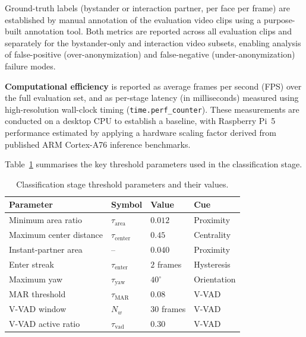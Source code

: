 Ground-truth labels (bystander or interaction partner, per face per frame) are
established by manual annotation of the evaluation video clips using a purpose-built
annotation tool. Both metrics are reported across all evaluation clips and separately for
the bystander-only and interaction video subsets, enabling analysis of false-positive
(over-anonymization) and false-negative (under-anonymization) failure modes.

\textbf{Computational efficiency} is reported as average frames per second (FPS) over
the full evaluation set, and as per-stage latency (in milliseconds) measured using
high-resolution wall-clock timing (\texttt{time.perf\_counter}). These measurements are
conducted on a desktop CPU to establish a baseline, with Raspberry Pi~5 performance
estimated by applying a hardware scaling factor derived from published ARM
Cortex-A76 inference benchmarks.

Table~\ref{tab:params} summarises the key threshold parameters used in the classification
stage.

\begin{table}[htbp]
\begin{singlespace}
\centering
\caption{Classification stage threshold parameters and their values.}
\label{tab:params}
\renewcommand{\arraystretch}{1.3}
\begin{tabular}{@{}llll@{}}
\toprule
\textbf{Parameter} & \textbf{Symbol} & \textbf{Value} & \textbf{Cue} \\
\midrule
Minimum area ratio       & $\tau_{\mathrm{area}}$    & $0.012$   & Proximity \\
Maximum center distance  & $\tau_{\mathrm{center}}$  & $0.45$    & Centrality \\
Instant-partner area     & --                         & $0.040$   & Proximity \\
Enter streak             & $\tau_{\mathrm{enter}}$   & $2$ frames & Hysteresis \\
Maximum yaw              & $\tau_{\mathrm{yaw}}$     & $40^\circ$ & Orientation \\
MAR threshold            & $\tau_{\mathrm{MAR}}$     & $0.08$    & V-VAD \\
V-VAD window             & $N_w$                     & $30$ frames & V-VAD \\
V-VAD active ratio       & $\tau_{\mathrm{vad}}$     & $0.30$    & V-VAD \\
\bottomrule
\end{tabular}
\end{singlespace}
\end{table}


%
